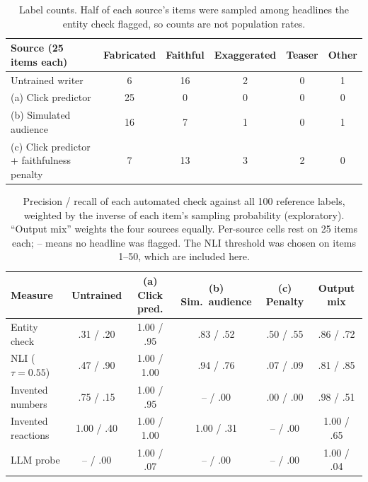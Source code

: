 \documentclass[11pt]{article}
\begin{document}
\begin{table}[h]
\centering\small
\begin{tabular}{@{}lccccc@{}}
\toprule
Source (25 items each) & Fabricated & Faithful & Exaggerated & Teaser & Other \\
\midrule
Untrained writer & 6 & 16 & 2 & 0 & 1 \\
(a) Click predictor & 25 & 0 & 0 & 0 & 0 \\
(b) Simulated audience & 16 & 7 & 1 & 0 & 1 \\
(c) Click predictor + faithfulness penalty & 7 & 13 & 3 & 2 & 0 \\
\bottomrule
\end{tabular}
\caption{Label counts. Half of each source's items were sampled among headlines the entity check flagged, so counts are not population rates.}
\end{table}


\begin{table}[h]
\centering\small
\setlength{\tabcolsep}{3.5pt}
\begin{tabular}{@{}lccccc@{}}
\toprule
Measure & Untrained & (a) Click pred. & (b) Sim.\ audience & (c) Penalty & Output mix \\
\midrule
Entity check & .31 / .20 & 1.00 / .95 & .83 / .52 & .50 / .55 & .86 / .72 \\
NLI ($\tau=0.55$) & .47 / .90 & 1.00 / 1.00 & .94 / .76 & .07 / .09 & .81 / .85 \\
Invented numbers & .75 / .15 & 1.00 / .95 & -- / .00 & .00 / .00 & .98 / .51 \\
Invented reactions & 1.00 / .40 & 1.00 / 1.00 & 1.00 / .31 & -- / .00 & 1.00 / .65 \\
LLM probe & -- / .00 & 1.00 / .07 & -- / .00 & -- / .00 & 1.00 / .04 \\
\bottomrule
\end{tabular}
\caption{Precision / recall of each automated check against all 100 reference labels, weighted by the inverse of each item's sampling probability (exploratory). ``Output mix'' weights the four sources equally. Per-source cells rest on 25 items each; -- means no headline was flagged. The NLI threshold was chosen on items 1--50, which are included here.}
\label{tab:bysource}
\end{table}
\end{document}
